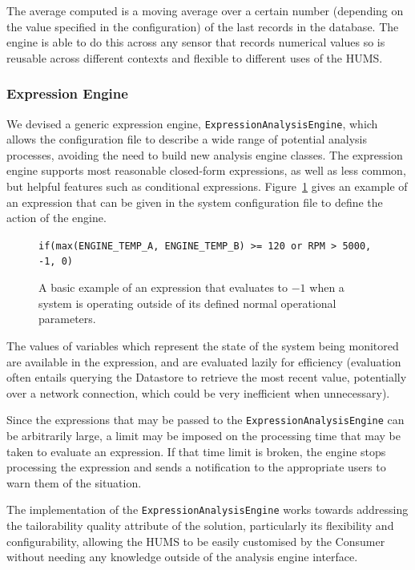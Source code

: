 \documentclass[10pt,a4paper]{article}
\begin{document}
The average computed is a moving average over a certain number (depending on the value specified in the configuration) of the last records in the database. The engine is able to do this across any sensor that records numerical values so is reusable across different contexts and flexible to different uses of the HUMS.

\subsubsection{Expression Engine}
We devised a generic expression engine, \texttt{ExpressionAnalysisEngine}, which allows the configuration file to describe a wide range of potential analysis processes, avoiding the need to build new analysis engine classes. The expression engine supports most reasonable closed-form expressions, as well as less common, but helpful features such as conditional expressions. Figure~\ref{fig:exprExample} gives an example of an expression that can be given in the system configuration file to define the action of the engine.
\begin{figure}[htbp]
\centering
\verb+if(max(ENGINE_TEMP_A, ENGINE_TEMP_B) >= 120 or RPM > 5000, -1, 0)+
\caption{A basic example of an expression that evaluates to $-1$ when a system is operating outside of its defined normal operational parameters.}
\label{fig:exprExample}
\end{figure}

The values of variables which represent the state of the system being monitored are available in the expression, and are evaluated lazily for efficiency (evaluation often entails querying the Datastore to retrieve the most recent value, potentially over a network connection, which could be very inefficient when unnecessary).

Since the expressions that may be passed to the \texttt{ExpressionAnalysisEngine} can be arbitrarily large, a limit may be imposed on the processing time that may be taken to evaluate an expression. If that time limit is broken, the engine stops processing the expression and sends a notification to the appropriate users to warn them of the situation.

The implementation of the \texttt{ExpressionAnalysisEngine} works towards addressing the tailorability quality attribute of the solution, particularly its flexibility and configurability, allowing the HUMS to be easily customised by the Consumer without needing any knowledge outside of the analysis engine interface.
\end{document}
